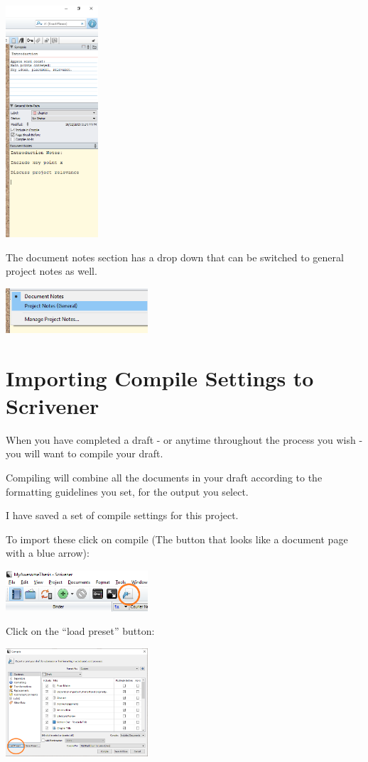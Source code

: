 \documentclass{article}
\begin{document}
\includegraphics[width=130px]{images/scriv009.PNG}

The document notes section has a drop down that can be switched to general project notes as well.

\includegraphics[width=200px]{images/scriv010.PNG}

\section{Importing Compile Settings to Scrivener}

When you have completed a draft - or anytime throughout the process you wish - you will want to compile your draft. 

Compiling will combine all the documents in your draft according to the formatting guidelines you set, for the output you select. 

I have saved a set of compile settings for this project. 

To import these click on compile (The button that looks like a document page with a blue arrow):

\includegraphics[width=200px]{images/scriv011.PNG}

Click on the ``load preset'' button:

\includegraphics[width=200px]{images/scriv012.PNG}
\end{document}
